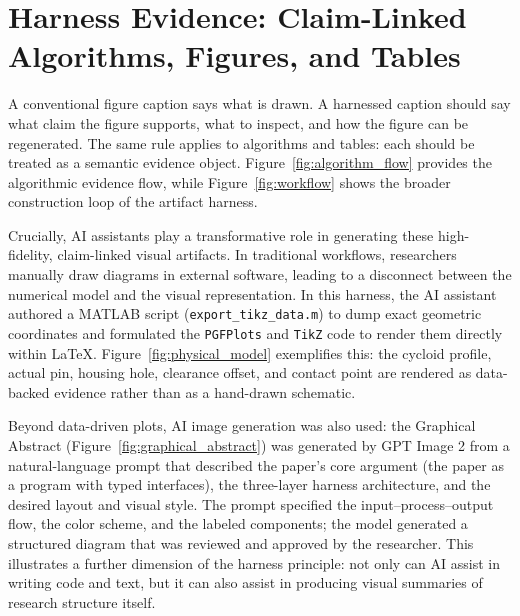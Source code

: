 \documentclass{article}
\begin{document}
\section{Harness Evidence: Claim-Linked Algorithms, Figures, and Tables}

A conventional figure caption says what is drawn. A harnessed caption should say what claim the figure supports, what to inspect, and how the figure can be regenerated. The same rule applies to algorithms and tables: each should be treated as a semantic evidence object. Figure~\ref{fig:algorithm_flow} provides the algorithmic evidence flow, while Figure~\ref{fig:workflow} shows the broader construction loop of the artifact harness.

Crucially, AI assistants play a transformative role in generating these high-fidelity, claim-linked visual artifacts. In traditional workflows, researchers manually draw diagrams in external software, leading to a disconnect between the numerical model and the visual representation. In this harness, the AI assistant authored a MATLAB script (\texttt{export\_tikz\_data.m}) to dump exact geometric coordinates and formulated the \texttt{PGFPlots} and \texttt{TikZ} code to render them directly within LaTeX. Figure~\ref{fig:physical_model} exemplifies this: the cycloid profile, actual pin, housing hole, clearance offset, and contact point are rendered as data-backed evidence rather than as a hand-drawn schematic.

Beyond data-driven plots, AI image generation was also used: the Graphical Abstract (Figure~\ref{fig:graphical_abstract}) was generated by GPT Image 2 from a natural-language prompt that described the paper's core argument (the paper as a program with typed interfaces), the three-layer harness architecture, and the desired layout and visual style. The prompt specified the input--process--output flow, the color scheme, and the labeled components; the model generated a structured diagram that was reviewed and approved by the researcher. This illustrates a further dimension of the harness principle: not only can AI assist in writing code and text, but it can also assist in producing visual summaries of research structure itself.
\end{document}

